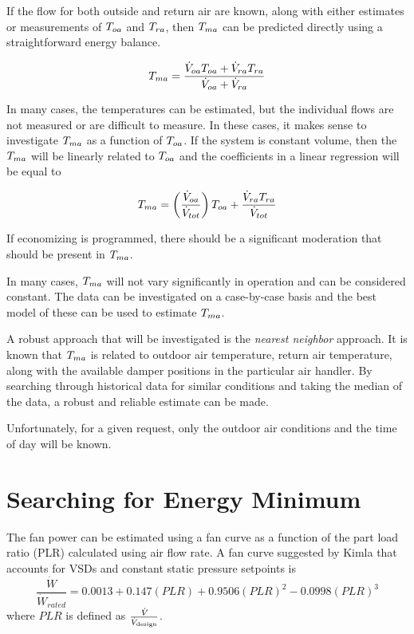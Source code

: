 If the flow for both outside and return air are known, along with either estimates or measurements of \(T_{oa}{}\) and \(T_{ra}{}\), then \(T_{ma}{}\) can be predicted directly using a straightforward energy balance. 

\begin{equation}
    T_{ma}{} = \frac{\dot{V}_{oa} T_{oa}{} + \dot{V}_{ra} T_{ra}{}}{\dot{V}_{oa}+\dot{V}_{ra}}
\end{equation}

In many cases, the temperatures can be estimated, but the individual flows are not measured or are difficult to measure. In these cases, it makes sense to investigate \(T_{ma}{}\) as a function of \(T_{oa}{}\). If the system is constant volume, then the \(T_{ma}\) will be linearly related to \(T_{oa}\) and the coefficients in a linear regression will be equal to

\begin{equation}
    T_{ma} = \left(  \frac{\dot{V}_{oa}}{\dot{V}_{tot}}\right) T_{oa} + \frac{\dot{V}_{ra}T_{ra}}{\dot{V}_{tot}}
\end{equation}

If economizing is programmed, there should be a significant moderation that should be present in \(T_{ma}{}\).

In many cases, \(T_{ma}\) will not vary significantly in operation and can be considered constant. The data can be investigated on a case-by-case basis and the best model of these can be used to estimate \(T_{ma}\).

A robust approach that will be investigated is the \textit{nearest neighbor} approach. It is known that \(T_{ma}\) is related to outdoor air temperature, return air temperature, along with the available damper positions in the particular air handler. By searching through historical data for similar conditions and taking the median of the data, a robust and reliable estimate can be made. 

Unfortunately, for a given request, only the outdoor air conditions and the time of day will be known. 


\section{Searching for Energy Minimum}

The fan power can be estimated using a fan curve as a function of the part load ratio (PLR) calculated using air flow rate. A fan curve suggested by Kimla that accounts for VSDs and constant static pressure setpoints is
\begin{equation}\label{eq:KimlaFanPower}
\frac{\dot{W}}{\dot{W}_{rated}} = 0.0013+0.147\left(PLR \right)+0.9506\left(PLR \right)^2-0.0998\left(PLR \right)^3
\end{equation}
where \(PLR\) is defined as \(\frac{\dot{V}_{}}{\dot{V}_{\text{design}}}\).

